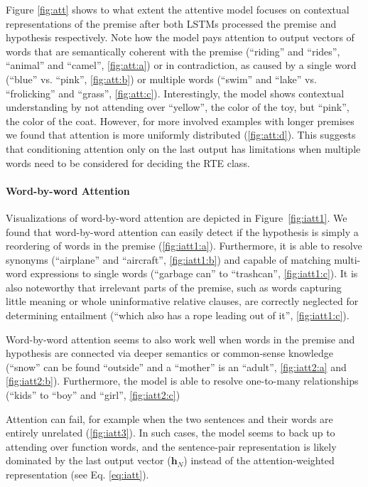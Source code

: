 \documentclass{article}
\begin{document}
Figure \ref{fig:att} shows to what extent the attentive model focuses on contextual representations of the premise after both LSTMs processed the premise and hypothesis respectively.
Note how the model pays attention to output vectors of words that are semantically coherent with the premise (``riding'' and ``rides'', ``animal'' and ``camel'', \ref{fig:att:a}) or in contradiction, as caused by a single word (``blue'' vs. ``pink'', \ref{fig:att:b}) or multiple words (``swim'' and ``lake'' vs. ``frolicking'' and ``grass'', \ref{fig:att:c}).
Interestingly, the model shows contextual understanding by not attending over ``yellow'', the color of the toy, but ``pink'', the color of the coat.
However, for more involved examples with longer premises we found that attention is more uniformly distributed (\ref{fig:att:d}).
This suggests that conditioning attention only on the last output has limitations when multiple words need to be considered for deciding the RTE class.

\paragraph{Word-by-word Attention}
Visualizations of word-by-word attention are depicted in Figure~\ref{fig:iatt1}.
We found that word-by-word attention can easily detect if the hypothesis is simply a reordering of words in the premise (\ref{fig:iatt1:a}).
Furthermore, it is able to resolve synonyms (``airplane'' and ``aircraft'', \ref{fig:iatt1:b}) and capable of matching multi-word expressions to single words (``garbage can'' to ``trashcan'', \ref{fig:iatt1:c}).
It is also noteworthy that irrelevant parts of the premise, such as words capturing little meaning or whole uninformative relative clauses, are correctly neglected for determining entailment (``which also has a rope leading out of it'', \ref{fig:iatt1:c}).

Word-by-word attention seems to also work well when words in the premise and hypothesis are connected via deeper semantics or common-sense knowledge (``snow'' can be found ``outside'' and a ``mother'' is an ``adult'', \ref{fig:iatt2:a} and \ref{fig:iatt2:b}).
Furthermore, the model is able to resolve one-to-many relationships (``kids'' to ``boy'' and ``girl'', \ref{fig:iatt2:c})

Attention can fail, for example when the two sentences and their words are entirely unrelated (\ref{fig:iatt3}).
In such cases, the model seems to back up to attending over function words, and the sentence-pair representation is likely dominated by the last output vector ($\mathbf{h}_N$) instead of the attention-weighted representation (see Eq. \ref{eq:iatt}).
\end{document}

